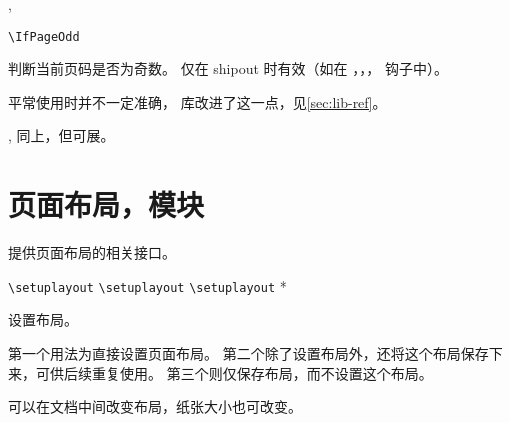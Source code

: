 \documentclass{cusdoc}
\begin{document}
\begin{function}{\IfPageOdd,\IfAbsPageOdd}
  \begin{syntax}
    \verb|\IfPageOdd|  
  \end{syntax}
判断当前页码是否为奇数。 仅在 shipout 时有效（如在 ，，，
 钩子中）。

平常使用时并不一定准确， 库改进了这一点，见\cref{sec:lib-ref}。
\end{function}

\begin{function}[EXP]{\@ifpageodd,\@ifabspageodd}
同上，但可展。
\end{function}


\section[float-barrier=on]{页面布局，模块}

 提供页面布局的相关接口。

\begin{function}{\setuplayout}
  \begin{syntax}
    \verb|\setuplayout|                \;
    \verb|\setuplayout|    
    \verb|\setuplayout| *  
  \end{syntax}
设置布局。

第一个用法为直接设置页面布局。
第二个除了设置布局外，还将这个布局保存下来，可供后续重复使用。
第三个则仅保存布局，而不设置这个布局。

可以在文档中间改变布局，纸张大小也可改变。
\end{function}
\end{document}
